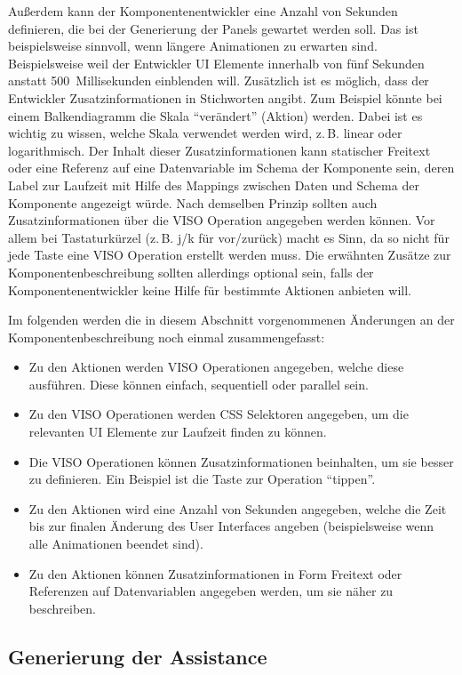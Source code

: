 \documentclass[
	headsepline,
	footsepline,
	fontsize=12pt,
	bibliography=totoc
]{scrbook}
\begin{document}
Außerdem kann der Komponentenentwickler eine Anzahl von Sekunden definieren, die bei der Generierung der Panels gewartet werden soll. Das ist beispielsweise sinnvoll, wenn längere Animationen zu erwarten sind. Beispielsweise weil der Entwickler UI Elemente innerhalb von fünf Sekunden anstatt 500~Millisekunden einblenden will. Zusätzlich ist es möglich, dass der Entwickler Zusatzinformationen in Stichworten angibt. Zum Beispiel könnte bei einem Balkendiagramm die Skala \enquote{verändert} (Aktion) werden. Dabei ist es wichtig zu wissen, welche Skala verwendet werden wird, z.\,B. linear oder logarithmisch. Der Inhalt dieser Zusatzinformationen kann statischer Freitext oder eine Referenz auf eine Datenvariable im Schema der Komponente sein, deren Label zur Laufzeit mit Hilfe des Mappings zwischen Daten und Schema der Komponente angezeigt würde. Nach demselben Prinzip sollten auch Zusatzinformationen über die VISO Operation angegeben werden können. Vor allem bei Tastaturkürzel (z.\,B. j/k für vor/zurück) macht es Sinn, da so nicht für jede Taste eine VISO Operation erstellt werden muss. Die erwähnten Zusätze zur Komponentenbeschreibung sollten allerdings optional sein, falls der Komponentenentwickler keine Hilfe für bestimmte Aktionen anbieten will.

Im folgenden werden die in diesem Abschnitt vorgenommenen Änderungen an der Komponentenbeschreibung noch einmal zusammengefasst:
\begin{itemize}
	\item Zu den Aktionen werden VISO Operationen angegeben, welche diese ausführen. Diese können einfach, sequentiell oder parallel sein.
	\item Zu den VISO Operationen werden CSS Selektoren angegeben, um die relevanten UI Elemente zur Laufzeit finden zu können.
	\item Die VISO Operationen können Zusatzinformationen beinhalten, um sie besser zu definieren. Ein Beispiel ist die Taste zur Operation \enquote{tippen}.
	\item Zu den Aktionen wird eine Anzahl von Sekunden angegeben, welche die Zeit bis zur finalen Änderung des User Interfaces angeben (beispielsweise wenn alle Animationen beendet sind).
	\item Zu den Aktionen können Zusatzinformationen in Form Freitext oder Referenzen auf Datenvariablen angegeben werden, um sie näher zu beschreiben.
\end{itemize}

\subsection{Generierung der Assistance}
\label{section:konzeption:bedienung:generierung}
\end{document}
